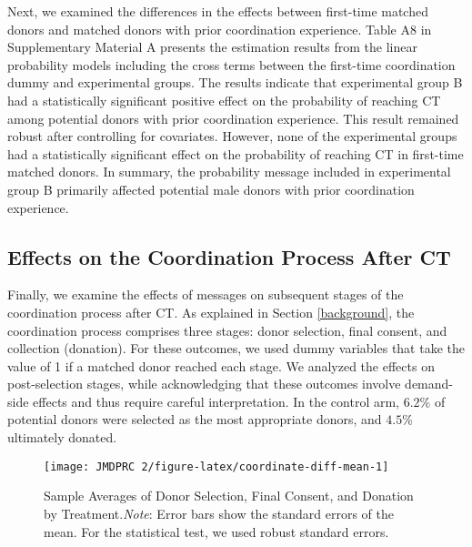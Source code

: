 \documentclass[12pt, a4paper]{article}
\begin{document}
Next, we examined the differences in the effects between first-time matched donors and matched donors with prior coordination experience. Table A8 in Supplementary Material A presents the estimation results from the linear probability models including the cross terms between the first-time coordination dummy and experimental groups. The results indicate that experimental group B had a statistically significant positive effect on the probability of reaching CT among potential donors with prior coordination experience. This result remained robust after controlling for covariates. However, none of the experimental groups had a statistically significant effect on the probability of reaching CT in first-time matched donors. In summary, the probability message included in experimental group B primarily affected potential male donors with prior coordination experience.

\hypertarget{process}{%
\subsection{Effects on the Coordination Process After CT}\label{process}}

Finally, we examine the effects of messages on subsequent stages of the coordination process after CT. As explained in Section \ref{background}, the coordination process comprises three stages: donor selection, final consent, and collection (donation). For these outcomes, we used dummy variables that take the value of 1 if a matched donor reached each stage. We analyzed the effects on post-selection stages, while acknowledging that these outcomes involve demand-side effects and thus require careful interpretation. In the control arm, \(6.2\)\% of potential donors were selected as the most appropriate donors, and \(4.5\)\% ultimately donated.

\begin{figure}[t]
\texttt{[image: JMDPRC~2/figure-latex/coordinate-diff-mean-1]} \caption{Sample Averages of Donor Selection, Final Consent, and Donation by Treatment.\newline \emph{Note}: Error bars show the standard errors of the mean. For the statistical test, we used robust standard errors.}\label{fig:coordinate-diff-mean}
\end{figure}
\end{document}
